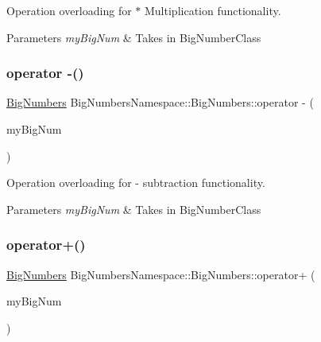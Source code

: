 Operation overloading for $\ast$ Multiplication functionality. 


\begin{DoxyParams}{Parameters}
{\em my\+Big\+Num} & Takes in Big\+Number\+Class \\
\hline
\end{DoxyParams}
\mbox{\label{class_big_numbers_namespace_1_1_big_numbers_ae56e4ef1d3590c5127540e25f00a5ce2}} 
\subsubsection{\texorpdfstring{operator -\/()}{operator -()}}
{\footnotesize\ttfamily \mbox{\hyperlink{class_big_numbers_namespace_1_1_big_numbers}{Big\+Numbers}} Big\+Numbers\+Namespace\+::\+Big\+Numbers\+::operator -\/ (\begin{DoxyParamCaption}\item[{const \mbox{\hyperlink{class_big_numbers_namespace_1_1_big_numbers}{Big\+Numbers}} \&}]{my\+Big\+Num }\end{DoxyParamCaption})\hspace{0.3cm}{\ttfamily [private]}}



Operation overloading for -\/ subtraction functionality. 


\begin{DoxyParams}{Parameters}
{\em my\+Big\+Num} & Takes in Big\+Number\+Class \\
\hline
\end{DoxyParams}
\mbox{\label{class_big_numbers_namespace_1_1_big_numbers_a4b074a7fd3903da94c9bd554608a45fa}} 
\subsubsection{\texorpdfstring{operator+()}{operator+()}}
{\footnotesize\ttfamily \mbox{\hyperlink{class_big_numbers_namespace_1_1_big_numbers}{Big\+Numbers}} Big\+Numbers\+Namespace\+::\+Big\+Numbers\+::operator+ (\begin{DoxyParamCaption}\item[{const \mbox{\hyperlink{class_big_numbers_namespace_1_1_big_numbers}{Big\+Numbers}} \&}]{my\+Big\+Num }\end{DoxyParamCaption})\hspace{0.3cm}{\ttfamily [private]}}



